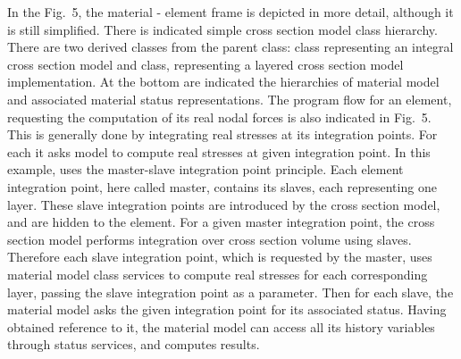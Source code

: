 \begin{htmlonly}
\begin{center}
In the Fig.~5, the material - element frame is
depicted in more detail, although it is still simplified. There is
indicated simple cross section model class hierarchy. There are two
derived classes from the parent  class: 
class representing an integral cross section model and  class, representing a layered cross section model
implementation. At the bottom are indicated the hierarchies of material model and
associated material status representations.
The program flow for an element, requesting the computation of its real nodal forces is also
indicated in Fig.~5. This is generally done by integrating real stresses at its integration
points. For each  it asks  model to
compute real stresses at given integration point. In this example,
 uses the master-slave integration point
principle. Each element integration point, here called master,
contains its slaves, each representing one layer. These slave
integration points are introduced by the cross section model, and are
hidden to the element. For a given master integration point, the cross section
model performs integration  over cross section
volume using slaves. Therefore  each slave integration point, which is requested
by the master, uses material model class services to compute real
stresses for each corresponding layer, passing the slave integration point as
a parameter. Then for each slave, the material model asks the given integration
point for its associated status.  Having obtained reference to it,
the material model can access all its history variables through status
services, and computes results.



\end{center}
\end{htmlonly}

